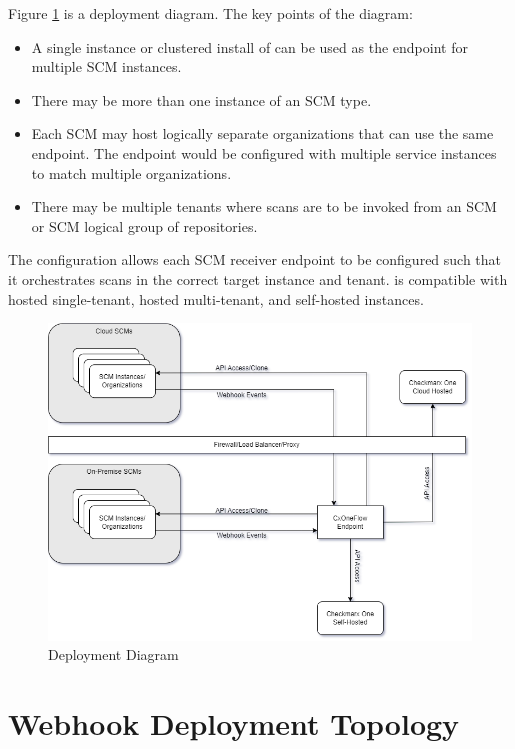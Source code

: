 Figure \ref{fig:cxoneflow-deployment} is a \cxoneflow deployment diagram. The key points of the diagram:

\begin{itemize}
    \item A single instance or clustered install of \cxoneflow can be used as the endpoint for multiple
    SCM instances.
    \item There may be more than one instance of an SCM type.
    \item Each SCM may host logically separate organizations that can use the same \cxoneflow endpoint.
    The endpoint would be configured with multiple service instances to match multiple organizations.
    \item There may be multiple \cxone tenants where scans are to be invoked from an SCM or SCM
    logical group of repositories.
\end{itemize}

The \cxoneflow configuration allows each SCM receiver endpoint to be configured such that it orchestrates
scans in the correct target \cxone instance and tenant. \cxoneflow is compatible with \cxone hosted 
single-tenant, hosted multi-tenant, and self-hosted instances.

\begin{figure}[ht]
    \includegraphics[width=\textwidth]{graphics/cxoneflow-deployment.png}
    \caption{\cxoneflow Deployment Diagram}
    \label{fig:cxoneflow-deployment}
\end{figure}

\section{Webhook Deployment Topology}

